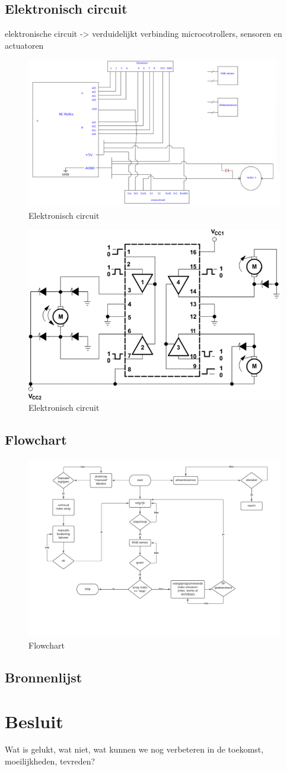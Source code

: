 \documentclass[kulak]{kulakarticle} %
\begin{document}
\subsection{Elektronisch circuit}
elektronische circuit -> verduidelijkt verbinding microcotrollers, sensoren en actuatoren 
\begin{figure}[h]
	\centering
	\includegraphics[width=.7\textwidth]{elektrischCircuit1}
	\caption{Elektronisch circuit}
	\label{fig:elektrischCircuit}
\end{figure}
\begin{figure}[h]
	\centering
	\includegraphics[width=.7\textwidth]{elektrischCircuit2}
	\caption{Elektronisch circuit}
	\label{fig:elektrischCircuit}
\end{figure}
\subsection{Flowchart}
\begin{figure}[h]
	\centering
	\includegraphics[width=.9\textwidth]{flowchart auto}
	\caption{Flowchart}
	\label{fig:flowchart}
\end{figure}
\subsection{Bronnenlijst}

\section*{Besluit}

Wat is gelukt, wat niet, wat kunnen we nog verbeteren in de toekomst, moeilijkheden, tevreden?
\end{document}
